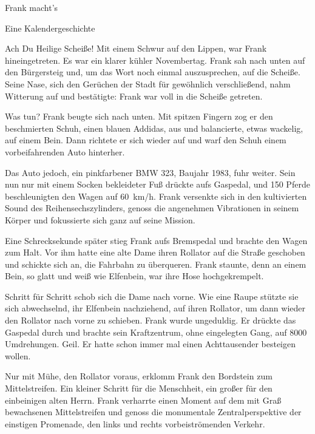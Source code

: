 \documentclass [a4paper, 11pt] {article}
\begin{document}


\begin{center}
{\sf\LARGE Frank macht's}
\par\medskip
{\sf Eine Kalendergeschichte}
\end{center}\par

\noindent Ach Du Heilige Scheiße! Mit einem Schwur auf den Lippen, war Frank hineingetreten. Es war ein klarer kühler Novembertag. Frank sah nach unten auf den Bürgersteig und, um das Wort noch einmal auszusprechen, auf die Scheiße. Seine Nase, sich den Gerüchen der Stadt für gewöhnlich verschließend, nahm Witterung auf und bestätigte: Frank war voll in die Scheiße getreten.

Was tun? Frank beugte sich nach unten. Mit spitzen Fingern zog er den beschmierten Schuh, einen blauen Addidas, aus und balancierte, etwas wackelig, auf einem Bein. Dann richtete er sich wieder auf und warf den Schuh einem vorbeifahrenden Auto hinterher. 

Das Auto jedoch, ein pinkfarbener BMW 323, Baujahr 1983, fuhr weiter. Sein nun nur mit einem Socken bekleideter Fuß drückte aufs Gaspedal, und 150 Pferde beschleunigten den Wagen auf \SI{60}{\km/\hour}. Frank versenkte sich in den kultivierten Sound des Reihensechszylinders, genoss die angenehmen Vibrationen in seinem Körper und fokussierte sich ganz auf seine Mission. 

Eine Schrecksekunde später stieg Frank aufs Bremspedal und brachte den Wagen zum Halt. Vor ihm hatte eine alte Dame ihren Rollator auf die Straße geschoben und schickte sich an, die Fahrbahn zu überqueren. Frank staunte, denn an einem Bein, so glatt und weiß wie Elfenbein, war ihre Hose hochgekrempelt. 

Schritt für Schritt schob sich die Dame nach vorne. Wie eine Raupe stützte sie sich abwechselnd, ihr Elfenbein nachziehend, auf ihren Rollator, um dann wieder den Rollator nach vorne zu schieben. Frank wurde ungeduldig. Er drückte das Gaspedal durch und brachte sein Kraftzentrum, ohne eingelegten Gang, auf 8000 Umdrehungen. Geil. Er hatte schon immer mal einen Achttausender besteigen wollen.

Nur mit Mühe, den Rollator voraus, erklomm Frank den Bordstein zum Mittelstreifen. Ein kleiner Schritt für die Menschheit, ein großer für den einbeinigen alten Herrn. Frank verharrte einen Moment auf dem mit Graß bewachsenen Mittelstreifen und genoss die monumentale Zentralperspektive der einstigen Promenade, den links und rechts vorbeiströmenden Verkehr.
\end{document}
